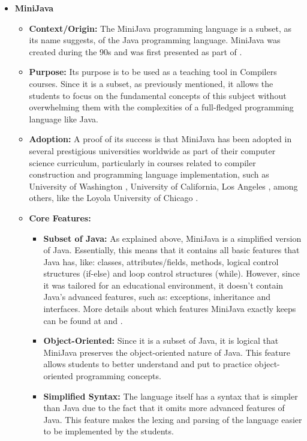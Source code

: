\begin{itemize}
    \item \textbf{MiniJava}
    \begin{itemize}
        \item \textbf{Context/Origin:} The MiniJava programming language \cite{cambridge_minijava_project} is a subset, as its name suggests, of the Java programming language. MiniJava was created during the 90s and was first presented as part of \cite{appel2002modernCompilerImplementationJava}.
        \item \textbf{Purpose:} Its purpose is to be used as a teaching tool in Compilers courses. Since it is a subset, as previously mentioned, it allows the students to focus on the fundamental concepts of this subject without overwhelming them with the complexities of a full-fledged programming language like Java.
        \item \textbf{Adoption:} A proof of its success is that MiniJava has been adopted in several prestigious universities worldwide as part of their computer science curriculum, particularly in courses related to compiler construction and programming language implementation, such as University of Washington \cite{university_of_washington_cs_compiler_construction_course_page_2024}, University of California, Los Angeles \cite{ucla_cs_compiler_construction_course_page_fall_2012}, among others, like the Loyola University of Chicago \cite{loyola_university_of_chicago_cs_compiler_construction_course_page_fall_2018}.
        \item \textbf{Core Features:}
        \begin{itemize}
            \item \textbf{Subset of Java:} As explained above, MiniJava is a simplified version of Java. Essentially, this means that it contains all basic features that Java has, like: classes, attributes/fields, methods, logical control structures (if-else) and loop control structures (while). However, since it was tailored for an educational environment, it doesn't contain Java's advanced features, such as: exceptions, inheritance and interfaces. More details about which features MiniJava exactly keeps can be found at \cite{cambridge_minijava_project} and \cite{cambridge_minijava_grammar}.
            \item \textbf{Object-Oriented:} Since it is a subset of Java, it is logical that MiniJava preserves the object-oriented nature of Java. This feature allows students to better understand and put to practice object-oriented programming concepts.
            \item \textbf{Simplified Syntax:} The language itself has a syntax that is simpler than Java due to the fact that it omits more advanced features of Java. This feature makes the lexing and parsing of the language easier to be implemented by the students.

\end{itemize}
\end{itemize}
\end{itemize}
